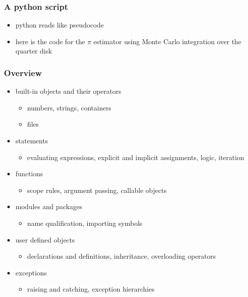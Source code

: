 \begin{frame}[fragile]
%
  \frametitle{A python script}
%
  \begin{itemize}
  \item python reads like pseudocode
  \item here is the code for the $\pi$ estimator using Monte Carlo integration over the quarter
    disk
  \end{itemize}
%

%
\end{frame}

\begin{frame}[fragile]
%
  \frametitle{Overview}
%
  \begin{itemize}
%
  \item built-in objects and their operators
    \begin{itemize}
    \item numbers, strings, containers
    \item files
    \end{itemize}
%
  \item statements
    \begin{itemize}
      \item evaluating expressions, explicit and implicit assignments, logic, iteration
    \end{itemize}
%
  \item functions
    \begin{itemize}
    \item scope rules, argument passing, callable objects
    \end{itemize}
%
  \item modules and packages
    \begin{itemize}
    \item name qualification, importing symbols
    \end{itemize}
%
  \item user defined objects
    \begin{itemize}
    \item declarations and definitions, inheritance, overloading operators
    \end{itemize}
%
  \item exceptions
    \begin{itemize}
    \item raising and catching, exception hierarchies
    \end{itemize}
%
  \end{itemize}
%
\end{frame}

